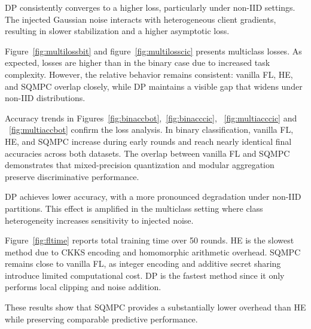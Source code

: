 \documentclass[journal,twoside,web]{ieeecolor}
\begin{document}
DP consistently converges to a higher loss, particularly under non-IID settings. The injected Gaussian noise interacts with heterogeneous client gradients, resulting in slower stabilization and a higher asymptotic loss.

Figure~\ref{fig:multilossbit} and figure~\ref{fig:multilosscic} presents multiclass losses. As expected, losses are higher than in the binary case due to increased task complexity. However, the relative behavior remains consistent: vanilla FL, HE, and SQMPC overlap closely, while DP maintains a visible gap that widens under non-IID distributions.

Accuracy trends in Figures~\ref{fig:binaccbot},~\ref{fig:binacccic}, ~\ref{fig:multiacccic} and ~\ref{fig:multiaccbot} confirm the loss analysis. In binary classification, vanilla FL, HE, and SQMPC increase during early rounds and reach nearly identical final accuracies across both datasets. The overlap between vanilla FL and SQMPC demonstrates that mixed-precision quantization and modular aggregation preserve discriminative performance.

DP achieves lower accuracy, with a more pronounced degradation under non-IID partitions. This effect is amplified in the multiclass setting  where class heterogeneity increases sensitivity to injected noise.

Figure~\ref{fig:fltime} reports total training time over 50 rounds. HE is the slowest method due to CKKS encoding and homomorphic arithmetic overhead. SQMPC remains close to vanilla FL, as integer encoding and additive secret sharing introduce limited computational cost. DP is the fastest method since it only performs local clipping and noise addition.

These results show that SQMPC provides a substantially lower overhead than HE while preserving comparable predictive performance.
\end{document}
